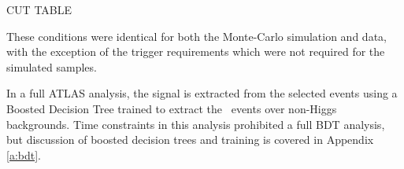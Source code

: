 		CUT TABLE

		These conditions were identical for both the Monte-Carlo simulation and data, with the exception of the trigger requirements which were not required for the simulated samples.

		In a full ATLAS analysis\cite{VBFHbb8tev}, the signal is extracted from the selected events using a Boosted Decision Tree trained to extract the \VBFHBB\, events over non-Higgs backgrounds. Time constraints in this analysis prohibited a full BDT analysis, but discussion of boosted decision trees and training is covered in Appendix \ref{a:bdt}.


\endinput
